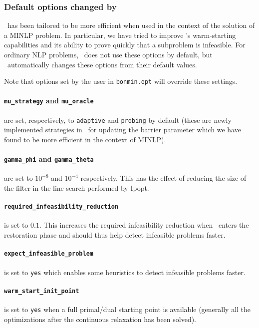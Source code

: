 \subsubsection{Default options changed by \Bonmin}
\Ipopt\ has been tailored to be more efficient when used in the context of the
solution of a MINLP problem. In particular, we have tried to
improve \Ipopt's warm-starting capabilities and its ability to prove quickly that a subproblem
is infeasible. For ordinary NLP problems, \Ipopt\ does not use these options
by default, but \Bonmin\ automatically changes these options from their default values.

Note that options set by the user in {\tt bonmin.opt} will override these
settings.

\paragraph{{\tt mu\_strategy} and {\tt mu\_oracle}} are set, respectively, to
{\tt adaptive} and {\tt probing} by default (these are newly implemented strategies in \Ipopt\
for updating the barrier parameter  which we have found to be
more efficient in the context of MINLP).
\paragraph{{\tt gamma\_phi} and {\tt gamma\_theta}} are set to $10^{-8}$ and $10^{-4}$
respectively. This has the effect of reducing the size of the filter in the line search performed by Ipopt.

\paragraph{\tt required\_infeasibility\_reduction} is set to $0.1$.
This increases the required infeasibility reduction when \Ipopt\ enters the
restoration phase and should thus help
detect infeasible problems faster.

\paragraph{\tt expect\_infeasible\_problem} is set to {\tt yes} which enables some heuristics
to detect infeasible problems faster.

\paragraph{\tt warm\_start\_init\_point} is set to {\tt yes} when a full primal/dual starting
point is available (generally all the optimizations after the continuous relaxation has been solved).


